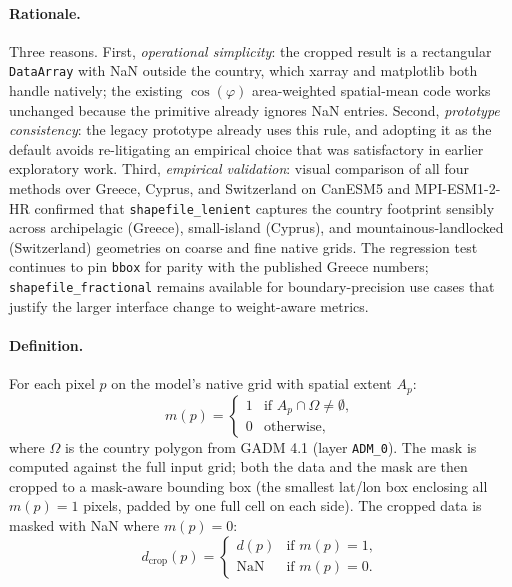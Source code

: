 \documentclass[11pt,a4paper]{article}
\begin{document}
\paragraph{Rationale.} Three reasons. First, \emph{operational simplicity}:
the cropped result is a rectangular \texttt{DataArray} with NaN outside the
country, which xarray and matplotlib both handle natively; the existing
$\cos(\varphi)$ area-weighted spatial-mean code works unchanged because the
 primitive already ignores
NaN entries. Second, \emph{prototype consistency}: the legacy
 prototype already uses this rule, and
adopting it as the default avoids re-litigating an empirical choice that was
satisfactory in earlier exploratory work. Third, \emph{empirical validation}:
visual comparison of all four methods over Greece, Cyprus, and Switzerland
on CanESM5 and MPI-ESM1-2-HR confirmed that \texttt{shapefile\_lenient}
captures the country footprint sensibly across archipelagic (Greece),
small-island (Cyprus), and mountainous-landlocked (Switzerland) geometries
on coarse and fine native grids. The regression test continues to pin
\texttt{bbox} for parity with the published Greece numbers;
\texttt{shapefile\_fractional} remains available for boundary-precision
use cases that justify the larger interface change to weight-aware metrics.

\paragraph{Definition.} For each pixel $p$ on the model's native grid with
spatial extent $A_p$:
%
\begin{equation}
  m(p) =
  \begin{cases}
    1 & \text{if } A_p \cap \Omega \neq \emptyset, \\
    0 & \text{otherwise},
  \end{cases}
\end{equation}
%
where $\Omega$ is the country polygon from GADM 4.1 (layer \texttt{ADM\_0}).
The mask is computed against the full input grid; both the data and the mask
are then cropped to a mask-aware bounding box (the smallest lat/lon box
enclosing all $m(p)=1$ pixels, padded by one full cell on each side). The
cropped data is masked with NaN where $m(p) = 0$:
%
\begin{equation}
  d_{\text{crop}}(p) =
  \begin{cases}
    d(p) & \text{if } m(p) = 1, \\
    \text{NaN} & \text{if } m(p) = 0.
  \end{cases}
\end{equation}
\end{document}
